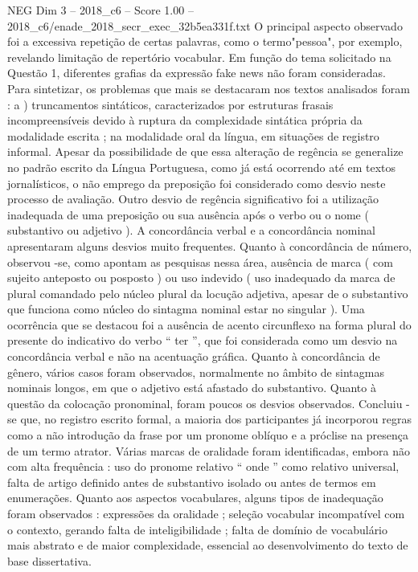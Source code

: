 \begin{textsample}{NEG Dim 3 – 2018\_c6 – Score 1.00 – 2018\_c6/enade\_2018\_secr\_exec\_32b5ea331f.txt}
O principal aspecto observado foi a excessiva repetição de certas palavras, como o termo"pessoa", por exemplo, revelando limitação de repertório vocabular.
Em função do tema solicitado na Questão 1, diferentes grafias da expressão fake news não foram consideradas.
Para sintetizar, os problemas que mais se destacaram nos textos analisados foram : a ) truncamentos sintáticos, caracterizados por estruturas frasais incompreensíveis devido à ruptura da complexidade sintática própria da modalidade escrita ; na modalidade oral da língua, em situações de registro informal.
Apesar da possibilidade de que essa alteração de regência se generalize no padrão escrito da Língua Portuguesa, como já está ocorrendo até em textos jornalísticos, o não emprego da preposição foi considerado como desvio neste processo de avaliação.
Outro desvio de regência significativo foi a utilização inadequada de uma preposição ou sua ausência após o verbo ou o nome ( substantivo ou adjetivo ).
A concordância verbal e a concordância nominal apresentaram alguns desvios muito frequentes.
Quanto à concordância de número, observou -se, como apontam as pesquisas nessa área, ausência de marca ( com sujeito anteposto ou posposto ) ou uso indevido ( uso inadequado da marca de plural comandado pelo núcleo plural da locução adjetiva, apesar de o substantivo que funciona como núcleo do sintagma nominal estar no singular ).
Uma ocorrência que se destacou foi a ausência de acento circunflexo na forma plural do presente do indicativo do verbo “ ter ”, que foi considerada como um desvio na concordância verbal e não na acentuação gráfica.
Quanto à concordância de gênero, vários casos foram observados, normalmente no âmbito de sintagmas nominais longos, em que o adjetivo está afastado do substantivo.
Quanto à questão da colocação pronominal, foram poucos os desvios observados.
Concluiu -se que, no registro escrito formal, a maioria dos participantes já incorporou regras como a não introdução da frase por um pronome oblíquo e a próclise na presença de um termo atrator.
Várias marcas de oralidade foram identificadas, embora não com alta frequência : uso do pronome relativo “ onde ” como relativo universal, falta de artigo definido antes de substantivo isolado ou antes de termos em enumerações.
Quanto aos aspectos vocabulares, alguns tipos de inadequação foram observados : expressões da oralidade ; seleção vocabular incompatível com o contexto, gerando falta de inteligibilidade ; falta de domínio de vocabulário mais abstrato e de maior complexidade, essencial ao desenvolvimento do texto de base dissertativa.

\end{textsample}
